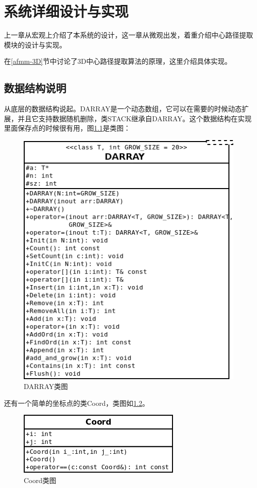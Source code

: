 \chapter{系统详细设计与实现}

上一章从宏观上介绍了本系统的设计，这一章从微观出发，着重介绍中心路径提取模块的设计与实现。

在\ref{afmm-3D}节中讨论了3D中心路径提取算法的原理，这里介绍具体实现。
\section{数据结构说明}

从底层的数据结构说起。DARRAY是一个动态数组，它可以在需要的时候动态扩展，并且它支持数据随机删除，类STACK继承自DARRAY。这个数据结构在实现里面保存点的时候很有用，图\ref{darray_class}是类图：
\begin{figure}[h!]
    \centering
    \includegraphics[width=300bp]{figure/darray.png}
    \caption{DARRAY类图}
    \label{darray_class}
\end{figure}

还有一个简单的坐标点的类Coord，类图如\ref{coord-class}。
\begin{figure}[h!]
    \centering
    \includegraphics[width=214bp]{figure/coord.png}
    \caption{Coord类图}
    \label{coord-class}
\end{figure}

